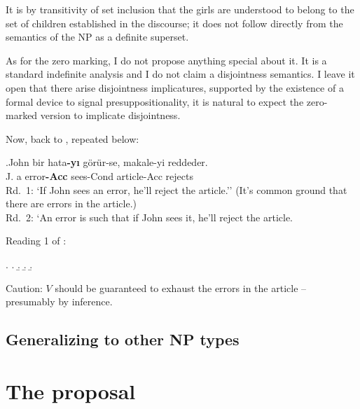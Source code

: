 \documentclass[11pt,a4paper]{article}
\begin{document}
It is by transitivity of set inclusion that the girls are understood to belong to the set of children established in the discourse; it does not follow directly from the semantics of the NP as a definite superset. 

As for the zero marking, I do not propose anything special about it. It is a standard indefinite analysis and I do not claim a disjointness semantics. I leave it open that there arise disjointness implicatures, supported by the existence of a formal device to signal presuppositionality, it is natural to expect the zero-marked version to implicate disjointness. 

Now, back to , repeated below:


\exg.\label{cond-w}John bir hata{\bf-yı} görür-se, makale-yi reddeder.\\
	J. a error{\bf-Acc} sees-Cond article-Acc rejects\\
	Rd.\ 1: `If John sees an error, he'll reject the article.'' (It's common
	ground that there are errors in the article.)\\
	Rd.\ 2: `An error is such that if John sees it, he'll reject the article.


\noindent Reading 1 of :

\ex.
\a.
\b.
\b.
\b.

Caution: $V$ should be guaranteed to exhaust the errors in the article --
presumably by inference.

\subsection{Generalizing to other NP types}

\section{The proposal}
\end{document}

